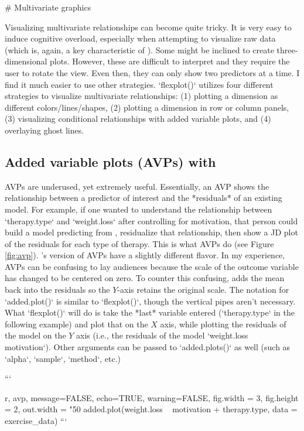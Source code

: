 {{{{{{{# Multivariate graphics

Visualizing multivariate relationships can become quite tricky. It is very easy to induce cognitive overload, especially when attempting to visualize raw data (which is, again, a key characteristic of ). Some might be inclined to create three-dimensional plots. However, these are difficult to interpret and they require the user to rotate the view. Even then, they can only show two predictors at a time. I find it much easier to use other strategies. `flexplot()` utilizes four different strategies to visualize multivariate relationships: (1) plotting a dimension as different colors/lines/shapes, (2) plotting a dimension in row or column panels, (3) visualizing conditional relationships with added variable plots, and (4) overlaying ghost lines. 

\subsection[Added variable plots (AVPs) with added.plot()]{Added variable plots (AVPs) with } \label{sec:added.plot}

AVPs are underused, yet extremely useful. Essentially, an AVP shows the relationship between a predictor of interest and the *residuals* of an existing model. For example, if one wanted to understand the relationship between `therapy.type` and `weight.loss` after controlling for motivation, that person could build a model predicting  from , residualize that relationship, then show a JD plot of the residuals for each type of therapy. This is what AVPs do (see Figure \ref{fig:avp}). 's version of AVPs have a slightly different flavor. In my experience, AVPs can be confusing to lay audiences because the scale of the outcome variable has changed to be centered on zero. To counter this confusing,  adds the mean back into the residuals so the $Y$-axis retains the original scale. The notation for `added.plot()` is similar to `flexplot()`, though the vertical pipes aren't necessary. What `flexplot()` will do is take the *last* variable entered (`therapy.type` in the following example) and plot that on the $X$ axis, while plotting the residuals of the model on the $Y$ axis (i.e., the residuals of the model `weight.loss ~ motivation`). Other arguments can be passed to `added.plots()` as well (such as `alpha`, `sample`, `method`, etc.)

```{r, avp, message=FALSE, echo=TRUE, warning=FALSE, fig.width = 3, fig.height = 2, out.width = "50%
added.plot(weight.loss ~ motivation + therapy.type, data = exercise_data)
```

}}}}}}}}
